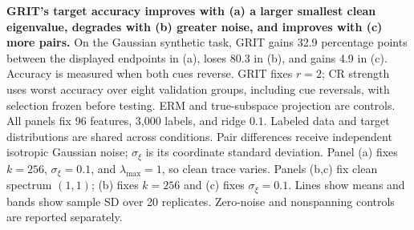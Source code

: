 \textbf{GRIT's target accuracy improves with (a) a larger smallest clean eigenvalue, degrades with (b) greater noise, and improves with (c) more pairs.} On the Gaussian synthetic task, GRIT gains 32.9 percentage points between the displayed endpoints in (a), loses 80.3 in (b), and gains 4.9 in (c). Accuracy is measured when both cues reverse. GRIT fixes $r=2$; CR strength uses worst accuracy over eight validation groups, including cue reversals, with selection frozen before testing. ERM and true-subspace projection are controls. All panels fix 96 features, 3,000 labels, and ridge $0.1$. Labeled data and target distributions are shared across conditions. Pair differences receive independent isotropic Gaussian noise; $\sigma_\xi$ is its coordinate standard deviation. Panel (a) fixes $k=256$, $\sigma_\xi=0.1$, and $\lambda_{\max}=1$, so clean trace varies. Panels (b,c) fix clean spectrum $(1,1)$; (b) fixes $k=256$ and (c) fixes $\sigma_\xi=0.1$. Lines show means and bands show sample SD over 20 replicates. Zero-noise and nonspanning controls are reported separately. 
